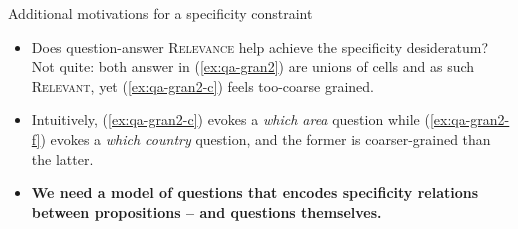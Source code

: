 \documentclass[10pt]{beamer}
\newcommand{\France}{\textbf{\textcolor{blue}{France}}}
\begin{document}
\begin{frame}{Additional motivations for a specificity constraint}
	\begin{itemize}
		\item Does question-answer \textsc{Relevance} help achieve the specificity desideratum? Not quite: both answer in (\ref{ex:qa-gran2}) are unions of cells and as such \textsc{Relevant}, yet (\ref{ex:qa-gran2-c}) feels too-coarse grained.
	\end{itemize}
	\begin{exe}
		\label{ex:qa-gran2}
		\begin{xlist}
			\ex[\#] {\textbf{\textcolor{green}{Western Europe}}}\label{ex:qa-gran2-c}
			\ex[]  {\France, \textbf{\textcolor{blue}{the UK}}, or \textbf{\textcolor{blue}{Germany}}}\label{ex:qa-gran2-f}
		\end{xlist}
	\end{exe}
	\begin{itemize}
		\item Intuitively, (\ref{ex:qa-gran2-c}) evokes a \textit{which area} question while (\ref{ex:qa-gran2-f}) evokes a \textit{which country} question, and the former is coarser-grained than the latter.
		\item \textbf{We need a model of questions that encodes specificity relations between propositions -- and questions themselves.}
	\end{itemize}
\end{frame}
\end{document}
